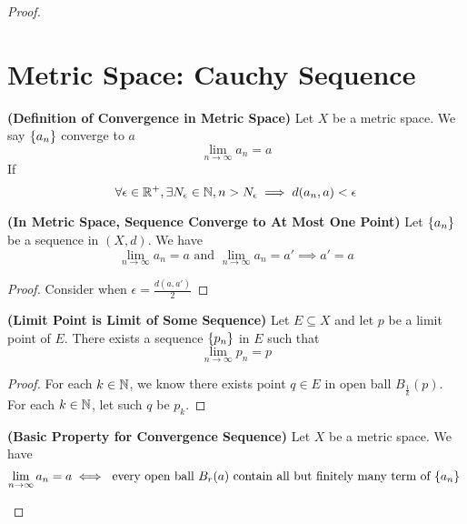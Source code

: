 \documentclass{report}
\begin{document}
\begin{proof}
\section{Metric Space: Cauchy Sequence}
\begin{definition}
\label{1.7.1}
\textbf{(Definition of Convergence in Metric Space)} Let $X$ be a metric space. We say $\{ a_n \}$ converge to $a$
 \begin{equation}
\lim_{n\to\infty}a_n=a
\end{equation}
If 
\begin{equation}
\forall \epsilon \in\mathbb{R}^+,\exists N_\epsilon\in\mathbb{N} , n>N_\epsilon \implies  d(a_n,a)<\epsilon 
\end{equation}
\end{definition}
\begin{theorem}
\label{1.7.2}
\textbf{(In Metric Space, Sequence Converge to At Most One Point)} Let $\{ a_n \}$ be a sequence in $(X,d)$. We have
\begin{equation}
\lim_{n\to\infty} a_n=a\text{ and }\lim_{n\to\infty} a_n=a'\implies a'=a
\end{equation}
\end{theorem}
\begin{proof}
Consider when $\epsilon =\frac{d(a,a')}{2}$
\end{proof}
\begin{theorem}
\label{1.7.3}
\textbf{(Limit Point is Limit of Some Sequence)} Let $E\subseteq X$ and let $p$ be a limit point of $E$. There exists a sequence $\{ p_n \}$ in $E$  such that
\begin{equation}
\lim_{n\to\infty}p_n=p
\end{equation}
\end{theorem}
\begin{proof}
For each $k\in\mathbb{N}$, we know there exists point  $q\in E$ in open ball $B_{\frac{1}{k}}(p)$. For each $k\in\mathbb{N}$, let such $q$ be  $p_k$. 
\end{proof}
\begin{theorem}
\label{1.7.4}
\textbf{(Basic Property for Convergence Sequence)} Let $X$ be a metric space. We have
\begin{equation}
\lim_{n\to\infty}a_n=a\iff  \text{ every open ball $B_r(a)$ contain all but finitely many term of $\set{a_n}$ }

\end{equation}
\end{theorem}
\end{proof}
\end{document}
